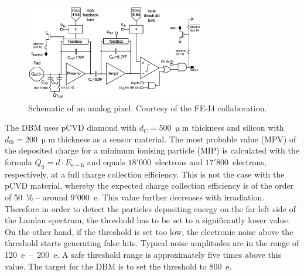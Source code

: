 \begin{figure}[!t]
\centering
\includegraphics[width=0.7\textwidth]{04_charge_monitoring/pics/analogPix}
\caption{Schematic of an analog pixel. Courtesy of the FE-I4 collaboration.}
\label{fig:anapix}
\end{figure}

The DBM uses pCVD diamond with $d_\mathrm{C}=500~\upmu$m thickness and silicon with $d_\mathrm{Si}=200~\upmu$m thickness as a sensor material. The most probable value (MPV) of the deposited charge for a minimum ionising particle (MIP) is calculated with the formula $Q_\mathrm{S}=d \cdot E_\mathrm{e-h}$ and equals $18'000$~electrons and $17'800$~electrons, respectively, at a full charge collection efficiency. This is not the case with the pCVD material, whereby the expected charge collection efficiency is of the order of 50~\%  -- around $9'000$~e. This value further decreases with irradiation. Therefore in order to detect the particles depositing energy on the far left side of the Landau spectrum, the threshold has to be set to a significantly lower value. On the other hand, if the threshold is set too low, the electronic noise above the threshold starts generating false hits. Typical noise amplitudes are in the range of 120~e~--~200~e. A safe threshold range is approximately five times above this value. The target for the DBM is to set the threshold to 800~e.

